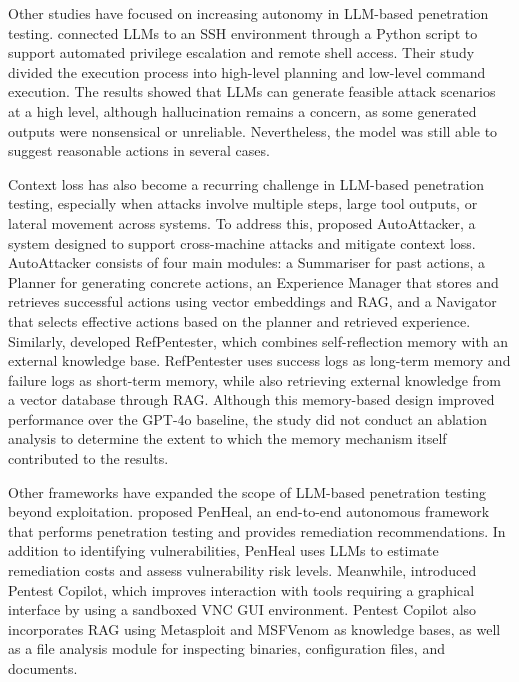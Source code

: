 \documentclass[acmtog]{acmart}
\begin{document}
Other studies have focused on increasing autonomy in LLM-based penetration testing. \citet{happe_getting_2023} connected LLMs to an SSH environment through a Python script to support automated privilege escalation and remote shell access. Their study divided the execution process into high-level planning and low-level command execution. The results showed that LLMs can generate feasible attack scenarios at a high level, although hallucination remains a concern, as some generated outputs were nonsensical or unreliable. Nevertheless, the model was still able to suggest reasonable actions in several cases.

Context loss has also become a recurring challenge in LLM-based penetration testing, especially when attacks involve multiple steps, large tool outputs, or lateral movement across systems. To address this, \citet{xu_autoattacker_2024} proposed AutoAttacker, a system designed to support cross-machine attacks and mitigate context loss. AutoAttacker consists of four main modules: a Summariser for past actions, a Planner for generating concrete actions, an Experience Manager that stores and retrieves successful actions using vector embeddings and RAG, and a Navigator that selects effective actions based on the planner and retrieved experience. Similarly, \citet{dai_refpentester_2025} developed RefPentester, which combines self-reflection memory with an external knowledge base. RefPentester uses success logs as long-term memory and failure logs as short-term memory, while also retrieving external knowledge from a vector database through RAG. Although this memory-based design improved performance over the GPT-4o baseline, the study did not conduct an ablation analysis to determine the extent to which the memory mechanism itself contributed to the results.

Other frameworks have expanded the scope of LLM-based penetration testing beyond exploitation. \citet{huang_penheal_2023} proposed PenHeal, an end-to-end autonomous framework that performs penetration testing and provides remediation recommendations. In addition to identifying vulnerabilities, PenHeal uses LLMs to estimate remediation costs and assess vulnerability risk levels. Meanwhile, \citet{goyal_hacking_2025} introduced Pentest Copilot, which improves interaction with tools requiring a graphical interface by using a sandboxed VNC GUI environment. Pentest Copilot also incorporates RAG using Metasploit and MSFVenom as knowledge bases, as well as a file analysis module for inspecting binaries, configuration files, and documents.
\end{document}
